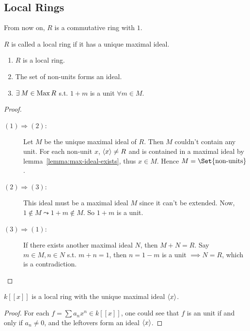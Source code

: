 \subsection{Local Rings}

From now on, $R$ is a commutative ring with $1$.

\begin{definition}
  $R$ is called a local ring if it has a unique maximal ideal.
\end{definition}

\begin{prop} \mbox{}
  \begin{enumerate}[(1)]
    \item $R$ is a local ring.
    \item The set of non-units forms an ideal.
    \item $\exists M \in \Max R$ s.t. $1 + m$ is a unit $\forall m \in M$.
  \end{enumerate}

  \begin{proof} \mbox{}
    \begin{description}
      \item[$(1)\Rightarrow(2)$:]
        Let $M$ be the unique maximal ideal of $R$. Then $M$ couldn't contain
        any unit. For each non-unit $x$,
        $\langle x\rangle \neq R$ and is contained in a maximal ideal by
        lemma~\ref{lemma:max-ideal-exists}, thus $x \in M$.
        Hence $M = \Set{ \text{non-units} }$.
      \item[$(2) \Rightarrow (3)$:]
        This ideal must be a maximal ideal $M$ since it can't be extended.
        Now, $1 \notin M \leadsto 1 + m \notin M$. So $1 + m$ is a unit.
      \item[$(3)\Rightarrow(1)$:]
        If there exists another maximal ideal $N$, then $M + N = R$.
        Say $m \in  M, n \in N$ s.t. $m + n = 1$, then $n = 1 - m$ is a unit
        $\implies N = R$, which is a contradiction.
    \end{description}
  \end{proof}
\end{prop}

\begin{example}
  $k[[x]]$ is a local ring with the unique maximal ideal $\langle x\rangle$.
  \begin{proof}
    For each $f = \sum a_n x^n \in k[[x]]$, one could see that $f$ is
    an unit if and only if $a_n \neq 0$, and the leftovers form an
    ideal $\langle x\rangle$.
  \end{proof}
\end{example}

